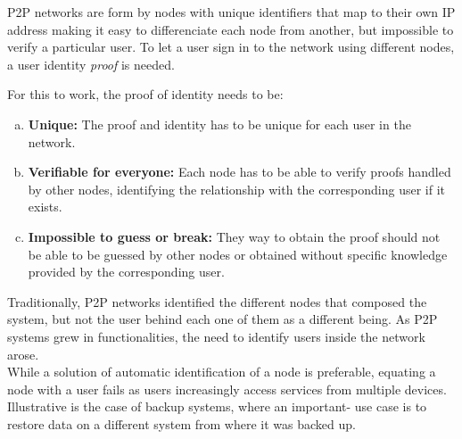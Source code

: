 P2P networks are form by nodes with unique identifiers that map to their
own IP address making it easy to differenciate each node from another, but
impossible to verify a particular user.
 To let a user sign in to the
network using different nodes, a user identity \textit{proof} is needed.


For this to work, the proof of identity needs to be:
\begin{enumerate}[a)]
  \item \textbf{Unique:} The proof and identity has to be unique for each user in the network.

  \item \textbf{Verifiable for everyone:}  Each node has to be able to verify proofs
    handled by other nodes, identifying the relationship with the corresponding user if it
    exists.
  \item \textbf{Impossible to guess or break:} They way to obtain the proof should not
    be able to be guessed by other nodes or obtained without specific knowledge
    provided by the corresponding user.
\end{enumerate}

Traditionally, P2P networks identified the different nodes that composed the
system, but not the user behind each one of them as a different being.
As P2P systems grew in functionalities, the need to identify users inside the
network arose.\\

While a solution of automatic identification of a node is preferable, equating a node with a user fails as users
increasingly access services from multiple devices.
Illustrative is the case of backup systems, where an important-
  use case is to restore data on a different system from where
it was backed up. \\

